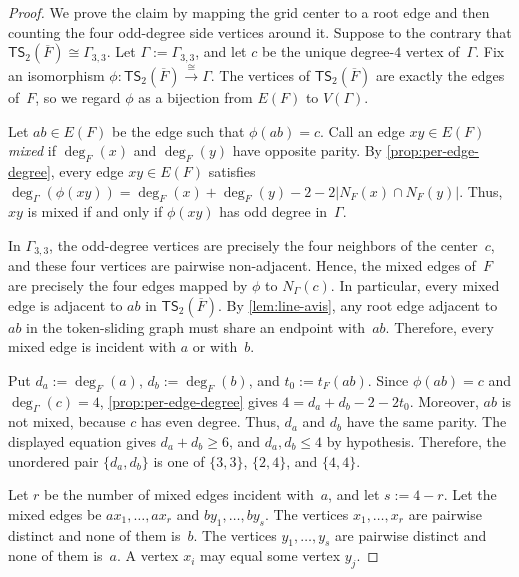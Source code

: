 \documentclass[a4paper]{article}
\theoremstyle{plain}
\theoremstyle{definition}
\newcommand{\TSsym}{\mathsf{TS}}
\numberwithin{equation}{section}
\begin{document}
\begin{proof}
We prove the claim by mapping the grid center to a root edge and then counting the four odd-degree side vertices around it.
Suppose to the contrary that $\TSsym_2(\overline{F})\cong \Gamma_{3,3}$.
Let $\Gamma:=\Gamma_{3,3}$, and let $c$ be the unique degree-$4$ vertex of~$\Gamma$.
Fix an isomorphism $\phi:\TSsym_2(\overline{F})\xrightarrow{\cong}\Gamma$.
The vertices of $\TSsym_2(\overline{F})$ are exactly the edges of~$F$, so we regard $\phi$ as a bijection from $E(F)$ to $V(\Gamma)$.

Let $ab\in E(F)$ be the edge such that $\phi(ab)=c$.
Call an edge $xy\in E(F)$ \emph{mixed} if $\deg_F(x)$ and $\deg_F(y)$ have opposite parity.
By \cref{prop:per-edge-degree}, every edge $xy\in E(F)$ satisfies $\deg_\Gamma(\phi(xy))=\deg_F(x)+\deg_F(y)-2-2|N_F(x)\cap N_F(y)|$.
Thus, $xy$ is mixed if and only if $\phi(xy)$ has odd degree in~$\Gamma$.

In $\Gamma_{3,3}$, the odd-degree vertices are precisely the four neighbors of the center~$c$, and these four vertices are pairwise non-adjacent.
Hence, the mixed edges of~$F$ are precisely the four edges mapped by $\phi$ to $N_\Gamma(c)$.
In particular, every mixed edge is adjacent to $ab$ in $\TSsym_2(\overline{F})$.
By \cref{lem:line-avis}, any root edge adjacent to $ab$ in the token-sliding graph must share an endpoint with~$ab$.
Therefore, every mixed edge is incident with $a$ or with~$b$.

Put $d_a:=\deg_F(a)$, $d_b:=\deg_F(b)$, and $t_0:=t_F(ab)$.
Since $\phi(ab)=c$ and $\deg_\Gamma(c)=4$, \cref{prop:per-edge-degree} gives $4=d_a+d_b-2-2t_0$.
Moreover, $ab$ is not mixed, because $c$ has even degree.
Thus, $d_a$ and $d_b$ have the same parity.
The displayed equation gives $d_a+d_b\ge 6$, and $d_a,d_b\le 4$ by hypothesis.
Therefore, the unordered pair $\{d_a,d_b\}$ is one of $\{3,3\}$, $\{2,4\}$, and $\{4,4\}$.

Let $r$ be the number of mixed edges incident with~$a$, and let $s:=4-r$.
Let the mixed edges be $ax_1,\ldots,ax_r$ and $by_1,\ldots,by_s$.
The vertices $x_1,\ldots,x_r$ are pairwise distinct and none of them is~$b$.
The vertices $y_1,\ldots,y_s$ are pairwise distinct and none of them is~$a$.
A vertex $x_i$ may equal some vertex $y_j$.


\end{proof}
\end{document}

